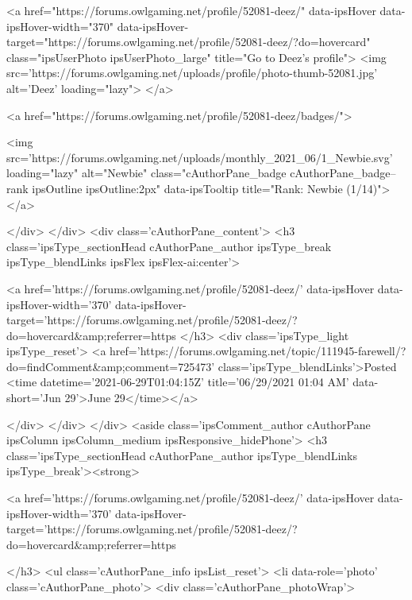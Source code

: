 	<a href="https://forums.owlgaming.net/profile/52081-deez/" data-ipsHover data-ipsHover-width="370" data-ipsHover-target="https://forums.owlgaming.net/profile/52081-deez/?do=hovercard" class="ipsUserPhoto ipsUserPhoto_large" title="Go to Deez's profile">
		<img src='https://forums.owlgaming.net/uploads/profile/photo-thumb-52081.jpg' alt='Deez' loading="lazy">
	</a>

				
				
					<a href="https://forums.owlgaming.net/profile/52081-deez/badges/">
						
<img src='https://forums.owlgaming.net/uploads/monthly_2021_06/1_Newbie.svg' loading="lazy" alt="Newbie" class="cAuthorPane_badge cAuthorPane_badge--rank ipsOutline ipsOutline:2px" data-ipsTooltip title="Rank: Newbie (1/14)">
					</a>
				
			</div>
		</div>
		<div class='cAuthorPane_content'>
			<h3 class='ipsType_sectionHead cAuthorPane_author ipsType_break ipsType_blendLinks ipsFlex ipsFlex-ai:center'>
				


<a href='https://forums.owlgaming.net/profile/52081-deez/' data-ipsHover data-ipsHover-width='370' data-ipsHover-target='https://forums.owlgaming.net/profile/52081-deez/?do=hovercard&amp;referrer=https%
			</h3>
			<div class='ipsType_light ipsType_reset'>
				<a href='https://forums.owlgaming.net/topic/111945-farewell/?do=findComment&amp;comment=725473' class='ipsType_blendLinks'>Posted <time datetime='2021-06-29T01:04:15Z' title='06/29/2021 01:04  AM' data-short='Jun 29'>June 29</time></a>
				
			</div>
		</div>
	</div>
	<aside class='ipsComment_author cAuthorPane ipsColumn ipsColumn_medium ipsResponsive_hidePhone'>
		<h3 class='ipsType_sectionHead cAuthorPane_author ipsType_blendLinks ipsType_break'><strong>


<a href='https://forums.owlgaming.net/profile/52081-deez/' data-ipsHover data-ipsHover-width='370' data-ipsHover-target='https://forums.owlgaming.net/profile/52081-deez/?do=hovercard&amp;referrer=https%
			
		</h3>
		<ul class='cAuthorPane_info ipsList_reset'>
			<li data-role='photo' class='cAuthorPane_photo'>
				<div class='cAuthorPane_photoWrap'>
					


